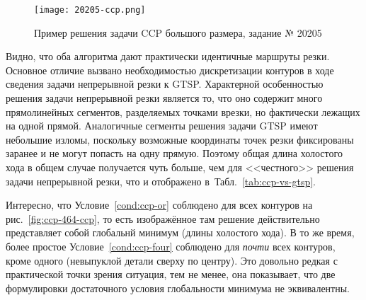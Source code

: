 \begin{figure}
  \centering
  \texttt{[image: 20205-ccp.png]}
  \caption{Пример решения задачи CCP большого размера, задание № 20205}
  \label{fig:ccp-20205}
\end{figure}

Видно,
что оба алгоритма дают практически идентичные
маршруты резки.
Основное отличие вызвано необходимостью дискретизации
контуров в ходе сведения задачи
непрерывной резки к GTSP.
Характерной особенностью
решения задачи непрерывной резки
является то,
что оно
содержит много прямолинейных сегментов,
разделяемых точками врезки,
но фактически лежащих на одной прямой.
Аналогичные сегменты решения задачи GTSP
имеют небольшие изломы,
поскольку возможные координаты точек резки
фиксированы заранее и не могут попасть на одну прямую.
Поэтому общая длина холостого хода
в общем случае получается чуть больше,
чем для <<честного>> решения задачи непрерывной резки,
что и отображено
в~Табл.~\ref{tab:ccp-vs-gtsp}.

Интересно,
что
Условие~\ref{cond:ccp-or}
соблюдено для всех контуров
на рис.~\ref{fig:ccp-464-ccp},
то есть изображённое там решение
действительно представляет собой
глобальнй минимум
(длины холостого хода).
В то же время,
более простое
Условие~\ref{cond:ccp-four}
соблюдено для
\textit{почти}
всех контуров,
кроме одного
(невыпуклой детали сверху по центру).
Это довольно редкая
с практической точки зрения ситуация,
тем не менее,
она показывает,
что две формулировки
достаточного условия
глобальности минимума
не эквивалентны.
